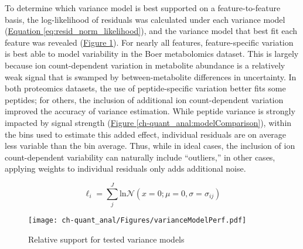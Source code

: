 To determine which variance model is best supported on a feature-to-feature basis, the log-likelihood of residuals was calculated under each variance model (\hyperref[eq:resid_norm_likelihood]{Equation \ref{eq:resid_norm_likelihood}}), and the variance model that best fit each feature was revealed (\hyperref[ch-quant_anal:modelFits]{Figure \ref{ch-quant_anal:modelFits}}). For nearly all features, feature-specific variation is best able to model variability in the Boer metabolomics dataset. This is largely because ion count-dependent variation in metabolite abundance is a relatively weak signal that is swamped by between-metabolite differences in uncertainty.  In both proteomics datasets, the use of peptide-specific variation better fits some peptides; for others, the inclusion of additional ion count-dependent variation improved the accuracy of variance estimation. While peptide variance is strongly impacted by signal strength (\hyperref[ch-quant_anal:modelComparison]{Figure \ref{ch-quant_anal:modelComparison}}), within the bins used to estimate this added effect, individual residuals are on average less variable than the bin average. Thus, while in ideal cases, the inclusion of ion count-dependent variability can naturally include ``outliers,'' in other cases, applying weights to individual residuals only adds additional noise. 

\begin{equation}
\ell_{i} = \sum_{j}^{J}\text{ln}\mathcal{N}(x = 0; \mu = 0, \sigma = \sigma_{ij})\label{eq:resid_norm_likelihood}
\end{equation}

\begin{figure}[h!]
\begin{center}
\texttt{[image: ch-quant\_anal/Figures/varianceModelPerf.pdf]}
\caption[Relative support for tested variance models]{Relative support for tested variance models}
\label{ch-quant_anal:modelFits}
\end{center}
\end{figure}

